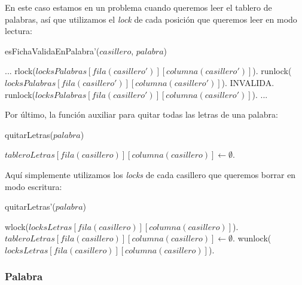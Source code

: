 \noindent En este caso estamos en un problema cuando queremos leer el tablero de palabras, así que utilizamos el \emph{lock} de cada posición que queremos leer en modo lectura:

\begin{algorithm}[H]
\caption{esFichaValidaEnPalabra'($casillero$, $palabra$)}
\begin{algorithmic}[1]
    \STATE ...
        \STATE rlock($locksPalabras[fila(casillero')][columna(casillero')]$).
            \STATE runlock($locksPalabras[fila(casillero')][columna(casillero')]$).
            \RETURN INVALIDA.
        \ENDIF
        \STATE runlock($locksPalabras[fila(casillero')][columna(casillero')]$).
    \ENDFOR
    \STATE ...
\end{algorithmic}
\end{algorithm}

Por último, la función auxiliar para quitar todas las letras de una palabra:

\begin{algorithm}[H]
\caption{quitarLetras($palabra$)}
\begin{algorithmic}[1]
        \STATE $tableroLetras[fila(casillero)][columna(casillero)] \leftarrow \emptyset$.
    \ENDFOR
\end{algorithmic}
\end{algorithm}

\noindent Aquí simplemente utilizamos los \emph{locks} de cada casillero que queremos borrar en modo escritura:

\begin{algorithm}[H]
\caption{quitarLetras'($palabra$)}
\begin{algorithmic}[1]
        \STATE wlock($locksLetras[fila(casillero)][columna(casillero)]$).
        \STATE $tableroLetras[fila(casillero)][columna(casillero)] \leftarrow \emptyset$.
        \STATE wunlock($locksLetras[fila(casillero)][columna(casillero)]$).
    \ENDFOR
\end{algorithmic}
\end{algorithm}

\subsubsection{Palabra}

